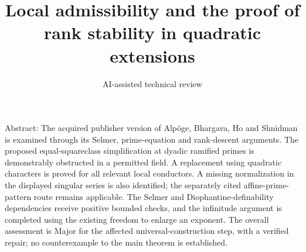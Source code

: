 \documentclass[10pt]{article}
\title{Local admissibility and the proof of rank stability in quadratic extensions}
\author{AI-assisted technical review}
\date{}
\begin{document}
\maketitle
Abstract: The acquired publisher version of Alpöge, Bhargava, Ho and Shnidman is examined through its Selmer, prime-equation and rank-descent arguments. The proposed equal-squareclass simplification at dyadic ramified primes is demonstrably obstructed in a permitted field. A replacement using quadratic characters is proved for all relevant local conductors. A missing normalization in the displayed singular series is also identified; the separately cited affine-prime-pattern route remains applicable. The Selmer and Diophantine-definability dependencies receive positive bounded checks, and the infinitude argument is completed using the existing freedom to enlarge an exponent. The overall assessment is Major for the affected universal-construction step, with a verified repair; no counterexample to the main theorem is established.\par
\end{document}
